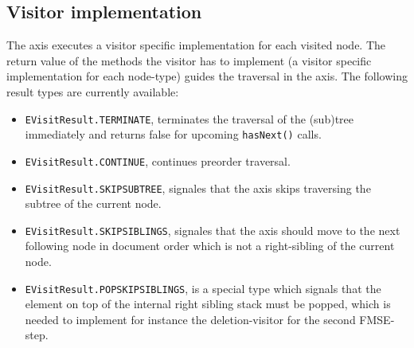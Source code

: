 \subsection{Visitor implementation}\label{subsec::visitor}
The axis executes a visitor specific implementation for each visited node. The return value of the methods the visitor has to implement (a visitor specific implementation for each node-type) guides the traversal in the axis. The following result types are currently available:

\begin{itemize}
\item \texttt{EVisitResult.TERMINATE}, terminates the traversal of the (sub)tree immediately and returns false for upcoming \texttt{hasNext()} calls.
\item \texttt{EVisitResult.CONTINUE}, continues preorder traversal.
\item \texttt{EVisitResult.SKIPSUBTREE}, signales that the axis skips traversing the subtree of the current node.
\item \texttt{EVisitResult.SKIPSIBLINGS}, signales that the axis should move to the next following node in document order which is not a right-sibling of the current node.
\item \texttt{EVisitResult.POPSKIPSIBLINGS}, is a special type which signals that the element on top of the internal right sibling stack must be popped, which is needed to implement for instance the deletion-visitor for the second FMSE-step.
\end{itemize}

